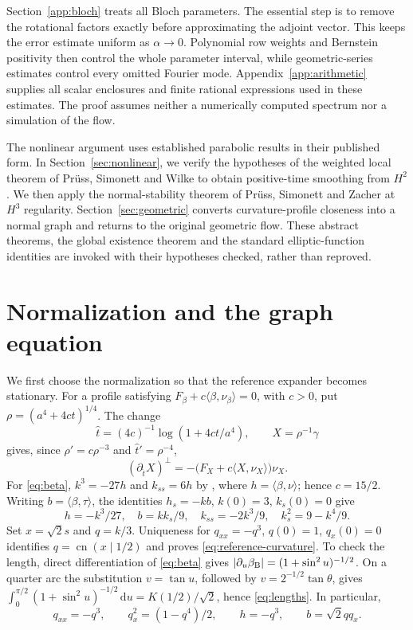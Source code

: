 \documentclass[a4paper,11pt]{article}
\numberwithin{equation}{section}
\theoremstyle{definition}
\theoremstyle{remark}
\newcommand{\dd}{\,\mathrm d}
\newcommand{\cn}{\operatorname{cn}}
\newcommand{\ip}[2]{\langle#1,#2\rangle}
\begin{document}
Section~\ref{app:bloch} treats all Bloch parameters. The essential step is to remove the rotational factors exactly before approximating the adjoint vector. This keeps the error estimate uniform as $\alpha\to0$. Polynomial row weights and Bernstein positivity then control the whole parameter interval, while geometric-series estimates control every omitted Fourier mode. Appendix~\ref{app:arithmetic} supplies all scalar enclosures and finite rational expressions used in these estimates. The proof assumes neither a numerically computed spectrum nor a simulation of the flow.

The nonlinear argument uses established parabolic results in their published form. In Section~\ref{sec:nonlinear}, we verify the hypotheses of the weighted local theorem of Pr\"uss, Simonett and Wilke \cite[Theorem~1.2]{PSW} to obtain positive-time smoothing from $H^2$. We then apply the normal-stability theorem of Pr\"uss, Simonett and Zacher \cite[Theorem~2.1]{PSZ} at $H^3$ regularity. Section~\ref{sec:geometric} converts curvature-profile closeness into a normal graph and returns to the original geometric flow. These abstract theorems, the global existence theorem and the standard elliptic-function identities are invoked with their hypotheses checked, rather than reproved.


\section{Normalization and the graph equation}\label{sec:geometry}
We first choose the normalization so that the reference expander becomes stationary. For a profile satisfying $F_\beta+c\ip\beta{\nu_\beta}=0$, with $c>0$, put $\rho=(a^4+4ct)^{1/4}$. The change
\begin{equation}\label{eq:normalization}
 \widehat t=(4c)^{-1}\log(1+4ct/a^4),\qquad X=\rho^{-1}\gamma
\end{equation}
gives, since $\rho'=c\rho^{-3}$ and $\widehat t'=\rho^{-4}$,
\begin{equation}\label{eq:normalized-flow}
 (\partial_{\widehat t} X)^\perp=-\big(F_X+c\ip X{\nu_X}\big)\nu_X.
\end{equation}
For \eqref{eq:beta}, $k^3=-27h$ and $k_{ss}=6h$ by \cite[Section~2.2.3]{MW}, where $h=\ip\beta\nu$; hence $c=15/2$. Writing $b=\ip\beta\tau$, the identities $h_s=-kb$, $k(0)=3$, $k_s(0)=0$ give
\begin{equation}\label{eq:bernoulli-identities}
 h=-k^3/27,\quad b=kk_s/9,\quad
 k_{ss}=-2k^3/9,\quad k_s^2=9-k^4/9.
\end{equation}
Set $x=\sqrt2s$ and $q=k/3$. Uniqueness for $q_{xx}=-q^3$, $q(0)=1$, $q_x(0)=0$ identifies $q=\cn(x\mid1/2)$ and proves \eqref{eq:reference-curvature}. To check the length, direct differentiation of \eqref{eq:beta} gives $|\partial_u\beta_{\rm B}|=(1+\sin^2u)^{-1/2}$. On a quarter arc the substitution $v=\tan u$, followed by $v=2^{-1/2}\tan\theta$, gives $\int_0^{\pi/2}(1+\sin^2u)^{-1/2}\dd u=K(1/2)/\sqrt2$, hence \eqref{eq:lengths}. In particular,
\begin{equation}\label{eq:q-identities}
 q_{xx}=-q^3,\qquad q_x^2=(1-q^4)/2,\qquad
 h=-q^3,\qquad b=\sqrt2qq_x.
\end{equation}
\end{document}
